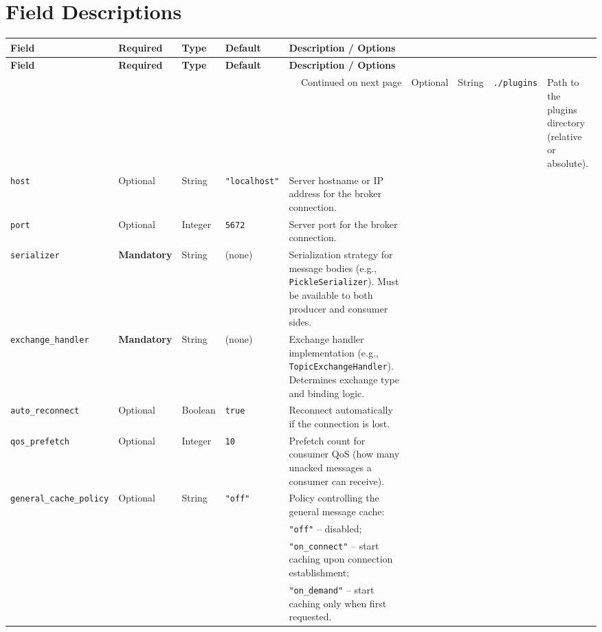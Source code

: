 \section*{Field Descriptions}

\renewcommand{\arraystretch}{1.2}
\begin{longtable}{@{}p{4cm}p{2cm}p{2.2cm}p{3cm}p{6cm}@{}}
\toprule
\textbf{Field} & \textbf{Required} & \textbf{Type} & \textbf{Default} & \textbf{Description / Options} \\
\midrule
\endfirsthead
\toprule
\textbf{Field} & \textbf{Required} & \textbf{Type} & \textbf{Default} & \textbf{Description / Options} \\
\midrule
\endhead
\midrule
\multicolumn{5}{r}{\small Continued on next page}
\endfoot
\bottomrule
\endlastfoot

\texttt{plugins\_path} & Optional & String & \texttt{./plugins} & Path to the plugins directory (relative or absolute). \\

\texttt{host} & Optional & String & \texttt{"localhost"} & Server hostname or IP address for the broker connection. \\

\texttt{port} & Optional & Integer & \texttt{5672} & Server port for the broker connection. \\

\texttt{serializer} & \textbf{Mandatory} & String & (none) & Serialization strategy for message bodies (e.g., \texttt{PickleSerializer}). Must be available to both producer and consumer sides. \\

\texttt{exchange\_handler} & \textbf{Mandatory} & String & (none) & Exchange handler implementation (e.g., \texttt{TopicExchangeHandler}). Determines exchange type and binding logic. \\

\texttt{auto\_reconnect} & Optional & Boolean & \texttt{true} & Reconnect automatically if the connection is lost. \\

\texttt{qos\_prefetch} & Optional & Integer & \texttt{10} & Prefetch count for consumer QoS (how many unacked messages a consumer can receive). \\

\texttt{general\_cache\_policy} & Optional & String & \texttt{"off"} & Policy controlling the general message cache: \\
& & & &
\quad \texttt{"off"} -- disabled; \\
& & & &
\quad \texttt{"on\_connect"} -- start caching upon connection establishment; \\
& & & &
\quad \texttt{"on\_demand"} -- start caching only when first requested. \\


\end{longtable}
